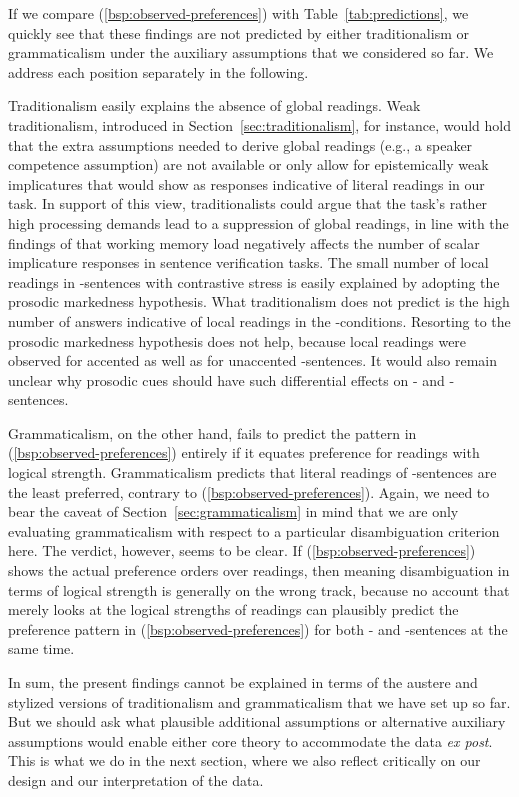\documentclass[fleqn,reqno,10pt]{article}
\newcommand{\as}{\acro{as}}
\renewcommand{\es}{\acro{es}}
\begin{document}
\noindent If we compare (\ref{bsp:observed-preferences}) with
Table~\ref{tab:predictions}, we quickly see that these findings are
not predicted by either traditionalism or grammaticalism under the
auxiliary assumptions that we considered so far. We address each
position separately in the following.

Traditionalism easily explains the absence of global readings. Weak
traditionalism, introduced in Section~\ref{sec:traditionalism}, for
instance, would hold that the extra assumptions needed to derive
global readings (e.g., a speaker competence assumption) are not
available or only allow for epistemically weak implicatures that would
show as responses indicative of literal readings in our task. In
support of this view, traditionalists could argue that the task's
rather high processing demands lead to a suppression of global
readings, in line with the findings of
\citet{NeysDe-NeysSchaeken2007:When-People-Are} that working memory
load negatively affects the number of scalar implicature responses in
sentence verification tasks. The small number of local readings in
\as-sentences with contrastive stress is easily explained by adopting
the prosodic markedness hypothesis. What traditionalism does not
predict is the high number of answers indicative of local readings in
the \es-conditions. Resorting to the prosodic markedness hypothesis
does not help, because local readings were observed for accented as
well as for unaccented \es-sentences. It would also remain unclear why
prosodic cues should have such differential effects on \as- and
\es-sentences.

Grammaticalism, on the other hand, fails to predict the pattern in
(\ref{bsp:observed-preferences}) entirely if it equates preference for
readings with logical strength. Grammaticalism predicts that literal
readings of \as-sentences are the least preferred, contrary to
(\ref{bsp:observed-preferences}). Again, we need to bear the caveat of
Section~\ref{sec:grammaticalism} in mind that we are only evaluating
grammaticalism with respect to a particular disambiguation criterion
here. The verdict, however, seems to be clear. If
(\ref{bsp:observed-preferences}) shows the actual preference orders
over readings, then meaning disambiguation in terms of logical
strength is generally on the wrong track, because no account that
merely looks at the logical strengths of readings can plausibly
predict the preference pattern in (\ref{bsp:observed-preferences}) for
both \as- and \es-sentences at the same time.

In sum, the present findings cannot be explained in terms of the
austere and stylized versions of traditionalism and grammaticalism
that we have set up so far. But we should ask what plausible
additional assumptions or alternative auxiliary assumptions would
enable either core theory to accommodate the data \emph{ex post}. This
is what we do in the next section, where we also reflect critically on
our design and our interpretation of the data. 
\end{document}
